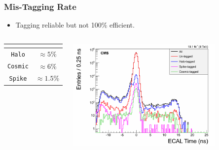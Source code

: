 \documentclass{beamer}
\begin{document}
 \begin{frame}
\frametitle{Mis-Tagging Rate}
 \begin{minipage}[t]{0.8\paperwidth}
   \begin{itemize}
    \item Tagging reliable but not 100\% efficient.
   \end{itemize}

  \begin{columns}
    \begin{tcolorbox}[colback=UNL@Cream!5,colframe=UMN@Maroon!40,title=Mis-Tag Rates]
     \begin{tabular}{|| c|c||}
        \multicolumn{2}{c}{\bfseries{}} \\
        \hline 
         \texttt{Halo} & $\approx 5$\% \\       
          \hline \hline
         \texttt{Cosmic}& $\approx 6$\% \\
          \hline \hline   
         \texttt{Spike} & $\approx 1.5$\% \\
        \hline
        \end{tabular} 
    \end{tcolorbox}
 \begin{tcolorbox}[colback=UNL@Cream!5,colframe=UMN@Maroon!40,title=Tagging Performance]
 
    \includegraphics[height=5.5cm,width=0.40\paperwidth]{THESISPLOTS/TimeForAll.png}
    
 \end{tcolorbox}
  \end{columns}
   \end{minipage}
\end{frame}
\end{document}
